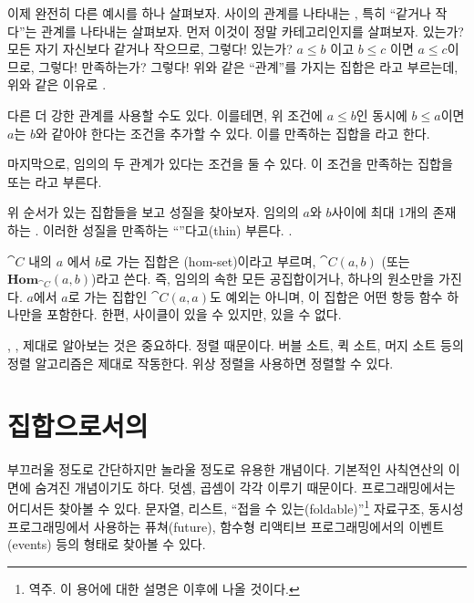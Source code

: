 이제 완전히 다른 예시를 하나 살펴보자.
\trMorphism\이 \trObject 사이의 관계를 나타내는 \trCategory, 특히 ``같거나 작다''는 관계를 나타내는 \trCategory\를 살펴보자.
먼저 이것이 정말 카테고리인지를 살펴보자. 
\trIdentityMorphism\은 있는가? 모든 \trObject\는 자기 자신보다 같거나 작으므로, 그렇다!
\trComposition\은 있는가? $a \leqslant b$ 이고 $b \leqslant c$ 이면 $a \leqslant c$이므로, 그렇다!
\trComposition\은 \trAssociativity\를 만족하는가? 그렇다!
위와 같은 ``관계''를 가지는 집합은 \newterm{\trPreorder}라고 부르는데, 위와 같은 이유로 \trPreorder\는 .

다른 더 강한 관계를 사용할 수도 있다. 이를테면, 위 조건에 $a \leqslant b$인 동시에 $b \leqslant a$이면 $a$는 $b$와 같아야 한다는 조건을 추가할 수 있다.
이를 만족하는 집합을 \newterm{\trPartialOrder}라고 한다.

마지막으로, 임의의 두  관계가 있다는 조건을 둘 수 있다.
이 조건을 만족하는 집합을 \newterm{\trLinearOrder} 또는 \newterm{\trTotalOrder}라고 부른다.

위 순서가 있는 집합들을 \trCategory\로 보고 성질을 찾아보자.
\trPreorder\는 임의의 \trObject $a$와 $b$사이에 최대 1개의 \trMorphism\이 존재하는 .
이러한 성질을 만족하는 \trCategory\를 ``\trThin''다고(thin) 부른다. \trPreorder\는 \trThin\은 .


\trCategory  $\cat{C}$ 내의 \trObject  $a$ 에서 \trObject  $b$로 가는  집합은
\newterm{\trHomSet}(hom-set)이라고 부르며, $\cat{C}(a, b)$ (또는 $\mathbf{Hom}_{\cat{C}}(a, b)$)라고 쓴다. 
즉, 임의의  속한 모든 \trHomSet\은 공집합이거나, 하나의 원소만을 가진다. 
$a$에서 $a$로 가는  집합인 $\cat{C}(a, a)$도 예외는 아니며, 이 집합은 어떤  항등 함수 하나만을 포함한다.
한편,  사이클이 있을 수 있지만,  있을 수 없다.

\trPreorder, \trPartialOrder, \trTotalOrder\를 제대로 알아보는 것은 중요하다. 정렬 때문이다.
버블 소트, 퀵 소트, 머지 소트 등의 정렬 알고리즘은  제대로 작동한다.
\trPartialOrder\는 위상 정렬을 사용하면 정렬할 수 있다.

\section{집합으로서의 \trMonoid}

\trMonoid\는 부끄러울 정도로 간단하지만 놀라울 정도로 유용한 개념이다.
기본적인 사칙연산의 이면에 숨겨진 개념이기도 하다. 덧셈, 곱셈이 각각 \trMonoid\를 이루기 때문이다.
\trMonoid\는 프로그래밍에서는 어디서든 찾아볼 수 있다.
문자열, 리스트, ``접을 수 있는(foldable)''\footnote{역주. 이 용어에 대한 설명은 이후에 나올 것이다.} %
자료구조, 동시성 프로그래밍에서 사용하는 퓨쳐(future), 함수형 리액티브 프로그래밍에서의 이벤트(events) 
등의 형태로 \trMonoid\를 찾아볼 수 있다.

